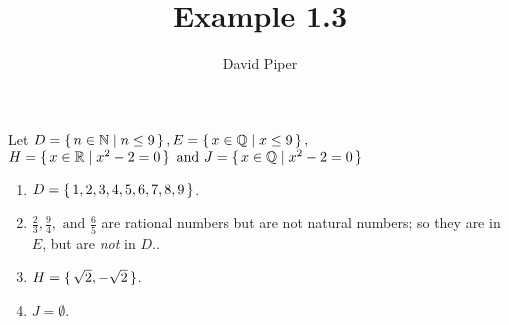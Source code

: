 \documentclass[12pt]{article}
\title{Example 1.3}
\author{David Piper}
\begin{document}
  \maketitle

  \begin{center}
    \begin{minipage}{0.8\textwidth}
      \raggedright
    Let $D = \set{n \in \mathbb{N} \mid n \leq 9},
        E=\set{x \in \mathbb{Q} \mid x \leq 9},$\\
        $H = \set{x \in \mathbb{R} \mid x^2-2=0} \text{ and }
        J = \set{x \in \mathbb{Q} \mid x^2-2=0}$
    \end{minipage}
  \end{center}
  \begin{enumerate}[label=(\alph*)]
    \item $D=\set{1, 2, 3, 4, 5, 6, 7, 8, 9}$.
    \item $\frac{2}{3}, \frac{9}{4}, \text{ and } \frac{6}{5}$ are rational numbers
    but are not natural numbers; so they are in $E$, but are \emph{not} in $D$..
    \item $H=\set{\sqrt{2}, -\sqrt{2}}$.
    \item $J = \emptyset$.
  \end{enumerate}
\end{document}

